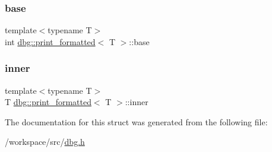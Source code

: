 \subsubsection{\texorpdfstring{base}{base}}
{\footnotesize\ttfamily template$<$typename T$>$ \\
int \hyperlink{structdbg_1_1print__formatted}{dbg\+::print\+\_\+formatted}$<$ T $>$\+::base}

\mbox{\label{structdbg_1_1print__formatted_a080056e4f7af0c86ed46bc2ecb9c6f1e}} 
\subsubsection{\texorpdfstring{inner}{inner}}
{\footnotesize\ttfamily template$<$typename T$>$ \\
T \hyperlink{structdbg_1_1print__formatted}{dbg\+::print\+\_\+formatted}$<$ T $>$\+::inner}



The documentation for this struct was generated from the following file\+:\begin{DoxyCompactItemize}
\item 
/workspace/src/\hyperlink{dbg_8h}{dbg.\+h}\end{DoxyCompactItemize}
